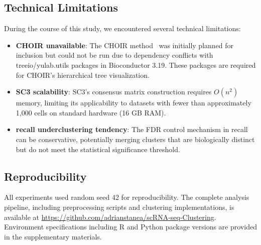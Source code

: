\subsection{Technical Limitations}

During the course of this study, we encountered several technical limitations:

\begin{itemize}[noitemsep]
    \item \textbf{CHOIR unavailable}: The CHOIR method~\cite{sant2025choir} was initially planned for inclusion but could not be run due to dependency conflicts with treeio/yulab.utils packages in Bioconductor 3.19. These packages are required for CHOIR's hierarchical tree visualization.

    \item \textbf{SC3 scalability}: SC3's consensus matrix construction requires $O(n^2)$ memory, limiting its applicability to datasets with fewer than approximately 1,000 cells on standard hardware (16 GB RAM).

    \item \textbf{recall underclustering tendency}: The FDR control mechanism in recall can be conservative, potentially merging clusters that are biologically distinct but do not meet the statistical significance threshold.
\end{itemize}

\subsection{Reproducibility}

All experiments used random seed 42 for reproducibility. The complete analysis pipeline, including preprocessing scripts and clustering implementations, is available at \url{https://github.com/adrianstanea/scRNA-seq-Clustering}. Environment specifications including R and Python package versions are provided in the supplementary materials.

